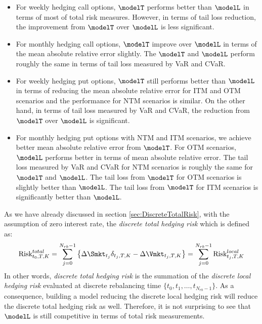 \begin{itemize}
	\item For weekly hedging call options, $\modelT$ performs better than $\modelL$ in terms of most of total risk measures. However, in terms of tail loss reduction, the improvement from $\modelT$ over   $\modelL$ is less significant.
	\item For monthly hedging call options, $\modelT$ improve over $\modelL$ in terms of  the mean absolute relative error slightly.  The $\modelT$ and $\modelL$ perform roughly the same in terms of tail loss measured by VaR and CVaR.
	\item For weekly hedging put options, $\modelT$ still performs better than $\modelL$ in terms of reducing the mean absolute relative error for ITM and OTM scenarios and the performance for NTM scenarios is similar. On the other hand, in terms of tail loss measured by VaR and CVaR, the reduction from $\modelT$ over $\modelL$ is significant.
	\item For monthly hedging put options with NTM and ITM scenarios, we achieve better  mean absolute relative error from $\modelT$. For OTM scenarios,   $\modelL$ performs better in terms of mean absolute relative error. The tail loss measured by VaR and CVaR for NTM scenarios is roughly the same for $\modelT$ and $\modelL$. The tail loss from $\modelT$ for OTM scenarios is slightly better than $\modelL$. The tail loss from $\modelT$ for ITM scenarios is significantly better than $\modelL$.
\end{itemize}

As we have already discussed in section \ref{sec:DiscreteTotalRisk}, with the assumption of zero interest rate, the {\em discrete total hedging risk} which is defined as:
\begin{equation}
\text{Risk}^{total}_{t_0,T,K}=\sum_{j=0}^{N_{rb}-1}\left\{ \Delta \Smkt_{t_j} \delta_{t_j,T,K} -\Delta \Vmkt_{t_j,T,K} \right\}=\sum_{j=0}^{N_{rb}-1}\text{Risk}^{local}_{t_j,T,K}
\end{equation}
In other words, {\em discrete total hedging risk} is the summation of the {\em discrete local hedging risk} evaluated at discrete rebalancing time $\{t_0,t_1,\dots,t_{N_{rb}-1}\}$. As a consequence, building a model reducing the discrete local hedging risk will reduce the discrete total hedging risk as well. Therefore, it is not surprising to see that $\modelL$ is still competitive in terms of total risk measurements.





